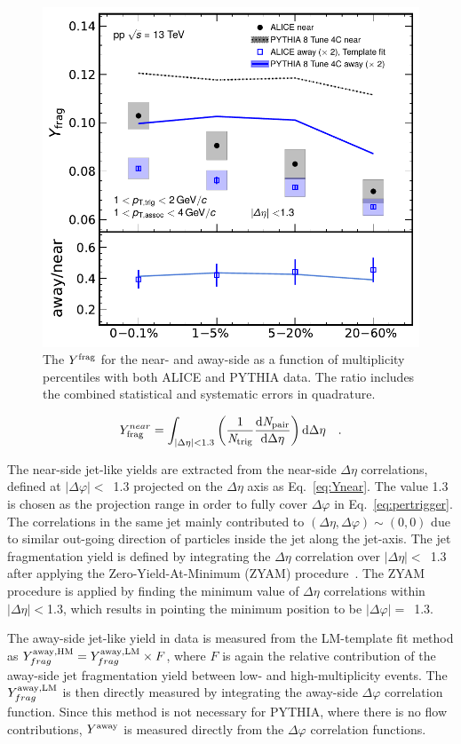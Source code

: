 \begin{figure}[h!]
	\centering
	\includegraphics[width=0.6 \textwidth]{figures/Fig5_Plot_v2Mult.pdf} 
	\caption{The $Y^{\rm{frag}}$ for the near- and away-side as a function of multiplicity percentiles with both ALICE and PYTHIA data. The ratio includes the combined statistical and systematic errors in quadrature.}
	\label{fig:Ymult}
\end{figure}

\begin{eqnarray}
Y^{near}_{\rm{frag}} = \int_{|\Delta \eta|<1.3} \left( \frac{1}{\it{N}_{\rm{trig}}} \frac{ \rm{d}\it{}N_{\rm{pair}} }{ \rm{d}\Delta\eta } \right) \rm{d} \Delta\eta \quad.
\label{eq:Ynear}
\end{eqnarray}
  
The near-side jet-like yields are extracted from the near-side $\Delta\eta$ correlations, defined at $|\Delta\varphi|<$~1.3 projected on the $\Delta\eta$ axis as Eq.~\ref{eq:Ynear}. The value 1.3 is chosen as the projection range in order to fully cover $\Delta\varphi$ in Eq.~\ref{eq:pertrigger}.
The correlations in the same jet mainly contributed to $(\Delta\eta, \Delta\varphi) \sim (0,0)$ due to similar out-going direction of particles inside the jet along the jet-axis. The jet fragmentation yield is defined by integrating the $\Delta\eta$ correlation over $|\Delta\eta|<$~1.3 after applying the Zero-Yield-At-Minimum (ZYAM) procedure~\cite{Ajitanand:2005jj}. The ZYAM procedure is applied by finding the minimum value of $\Delta\eta$ correlations within $|\Delta\eta|<$1.3, which results in pointing the minimum position to be $|\Delta\varphi|=$~1.3.

The away-side jet-like yield in data is measured from the LM-template fit method as $Y^{\rm{away, HM}}_{frag} = Y^{\rm{away, LM}}_{frag} \times F$, where $F$ is again the relative contribution of the away-side jet fragmentation yield between low- and high-multiplicity events. The $Y^{\rm{away, LM}}_{frag}$ is then directly measured by integrating the away-side $\Delta\varphi$ correlation function. Since this method is not necessary for PYTHIA, where there is no flow contributions, $Y^{\rm{away}}$ is measured directly from the $\Delta\varphi$ correlation functions.

